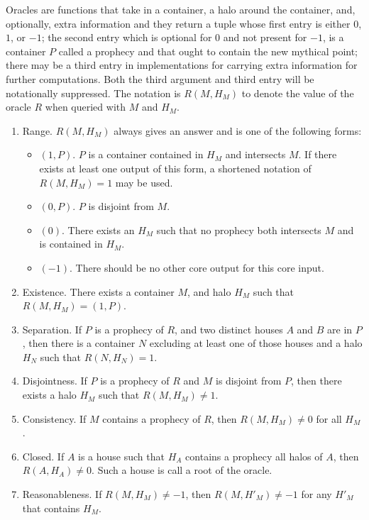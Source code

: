 \documentclass[12pt]{article}
\begin{document}
Oracles are functions that take in a container, a halo around the container, and, optionally, extra information and they return a tuple whose first entry is either $0$, $1$, or $-1$; the second entry which is optional for $0$ and not present for $-1$, is a container $P$ called a prophecy and that ought to contain the new mythical point; there may be a third entry in implementations for carrying extra information for further computations. Both the third argument and third entry will be notationally suppressed. The notation is $R(M, H_M)$ to denote the value of the oracle $R$ when queried with $M$ and $H_M$.

\begin{enumerate}
    \item Range. $R(M, H_M)$  always gives an answer and is one of the following forms: 
    \begin{itemize}
        \item $(1, P)$. $P$ is a container contained in $H_M$ and intersects $M$. If there exists at least one output of this form, a shortened notation of $R(M, H_M)=1$ may be used. 
        \item $(0, P)$. $P$ is disjoint from $M$.
        \item $(0)$.  There exists an $H_M$ such that no prophecy both intersects $M$ and is contained in $H_M$. 
        \item $(-1)$. There should be no other core output for this core input. 
    \end{itemize} 
    \item Existence. There exists a container $M$,  and halo $H_M$ such that $R(M, H_M) = (1, P)$. 
    \item Separation. If $P$ is a prophecy of $R$, and two distinct houses $A$ and $B$ are in $P$, then there is a container $N$ excluding at least one of those houses and a halo $H_N$ such that $R(N, H_N) =1 $.
   \item Disjointness. If $P$ is a prophecy of $R$ and $M$ is disjoint from $P$, then there exists a halo $H_M$ such that $R(M, H_M) \neq 1$.
    \item Consistency. If $M$ contains a prophecy of $R$, then $R(M, H_M) \neq 0$ for all $H_M$. 
    \item Closed. If $A$ is a house such that $H_A$ contains a prophecy all halos of $A$, then $R(A, H_A) \neq 0$. Such a house is call a root of the oracle. 
    \item Reasonableness. If $R(M, H_M) \neq -1$, then $R(M, H'_M) \neq -1$ for any $H'_M$ that contains $H_M$. 
\end{enumerate}
\end{document}
